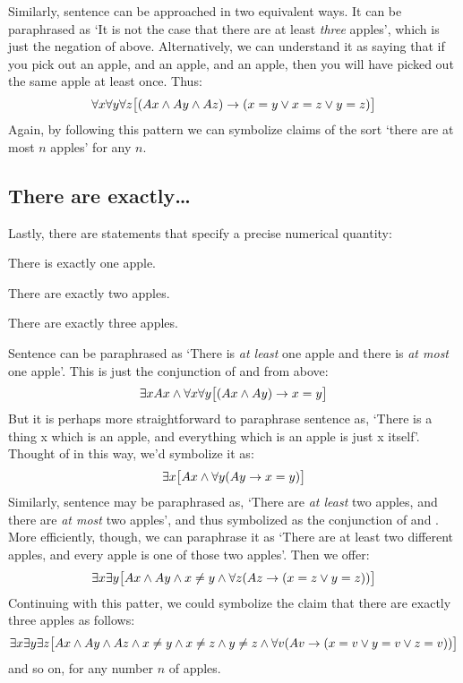 Similarly, sentence  can be approached in two equivalent ways. It can be paraphrased as `It is not the case that there are at least \emph{three} apples', which is just the negation of  above.  Alternatively, we can understand it as saying that if you pick out an apple, and an apple, and an apple, then you will have picked out the same apple at least once. Thus:
$$\forall x\forall y\forall z\bigl[(Ax \wedge Ay \wedge Az) \rightarrow (x=y \vee x=z \vee y=z)\bigr]$$
Again, by following this pattern we can symbolize claims of the sort `there are at most $n$ apples' for any $n$.
\subsection{There are exactly\ldots}
Lastly, there are statements that specify a precise numerical quantity:

\begin{earg}
\item[\ex{exactly1}] There is exactly one apple.
\item[\ex{exactly2}] There are exactly two apples.
\item[\ex{exactly3}] There are exactly three apples.
\end{earg}
Sentence  can be paraphrased as `There is \emph{at least} one apple and there is \emph{at most} one apple'. This is just the conjunction of  and   from above:
$$\exists x Ax \wedge \forall x\forall y\bigl[(Ax \wedge Ay) \rightarrow x=y\bigr]$$
But it is perhaps more straightforward to paraphrase sentence  as, `There is a thing x which is an apple, and everything which is an apple is just x itself'. Thought of in this way, we'd symbolize it as:
$$\exists x\bigl[Ax \wedge \forall y(Ay \rightarrow x= y)\bigr]$$
Similarly, sentence  may be paraphrased as, `There are \emph{at least} two apples, and there are \emph{at most} two apples', and thus symbolized as the conjunction of  and .
More efficiently, though, we can paraphrase it as `There are at least two different apples, and every apple is one of those two apples'. Then we offer:
$$\exists x\exists y\bigl[Ax \wedge Ay \wedge x \neq y \wedge \forall z(Az \rightarrow ( x= z \vee y = z))\bigr]$$
Continuing with this patter, we could symbolize the claim that there are exactly three apples as follows:
$$\exists x \exists y \exists z\bigl[Ax \wedge Ay \wedge Az \wedge x \neq y \wedge x \neq z \wedge y \neq z \wedge \forall v(Av \rightarrow (x = v \vee y = v \vee z = v))\bigr]$$
and so on, for any number $n$ of apples.


